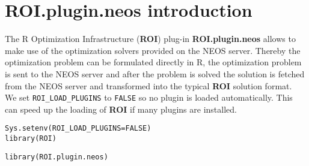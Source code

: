 \documentclass[a4paper]{article}\usepackage[]{graphicx}\usepackage[]{color}
\makeatletter
\newcommand{\hlnum}[1]{\textcolor[rgb]{0,0,0}{#1}}%
\newcommand{\hlstd}[1]{\textcolor[rgb]{0,0,0}{#1}}%
\newcommand{\hlkwc}[1]{\textcolor[rgb]{0,0,1}{#1}}%
\newcommand{\hlkwd}[1]{\textcolor[rgb]{0,0,0}{#1}}%
\newenvironment{kframe}{%
 \def\at@end@of@kframe{}%
 \ifinner\ifhmode%
  \def\at@end@of@kframe{\end{minipage}}%
  \begin{minipage}{\columnwidth}%
 \fi\fi%
 \def\FrameCommand##1{\hskip\@totalleftmargin \hskip-\fboxsep
 \colorbox{shadecolor}{##1}\hskip-\fboxsep
     \hskip-\linewidth \hskip-\@totalleftmargin \hskip\columnwidth}%
 \MakeFramed {\advance\hsize-\width
   \@totalleftmargin\z@ \linewidth\hsize
   \@setminipage}}%
 {\par\unskip\endMakeFramed%
 \at@end@of@kframe}
\newenvironment{knitrout}{}{} %
\newcommand{\pkg}[1]{\textbf{#1}}
\newcommand{\proglang}[1]{\textsf{#1}}
\newcommand{\code}[1]{\texttt{#1}}
\makeatother
\begin{document}
\section{\pkg{ROI.plugin.neos} introduction}
The R Optimization Infrastructure (\pkg{ROI}) plug-in \pkg{ROI.plugin.neos}
allows to make use of the optimization solvers provided on the NEOS server.
Thereby the optimization problem can be formulated directly in \proglang{R},
the optimization problem is sent to the NEOS server and after the 
problem is solved the solution is fetched from the NEOS server and
transformed into the typical \pkg{ROI} solution format. \\

We set \verb+ROI_LOAD_PLUGINS+ to \code{FALSE} so no plugin is loaded 
automatically. This can speed up the loading of \pkg{ROI} if many plugins 
are installed.

\begin{knitrout}
\color{fgcolor}\begin{kframe}
\begin{alltt}
\hlkwd{Sys.setenv}\hlstd{(}\hlkwc{ROI_LOAD_PLUGINS} \hlstd{=} \hlnum{FALSE}\hlstd{)}
\hlkwd{library}\hlstd{(ROI)}
\end{alltt}


{\ttfamily\noindent\itshape\color{messagecolor}{\#\# }}

{\ttfamily\noindent\itshape\color{messagecolor}{\#\# Registered solver plugins: nlminb.}}

{\ttfamily\noindent\itshape\color{messagecolor}{\#\# Default solver: auto.}}\begin{alltt}
\hlkwd{library}\hlstd{(ROI.plugin.neos)}
\end{alltt}
\end{kframe}
\end{knitrout}
\end{document}
